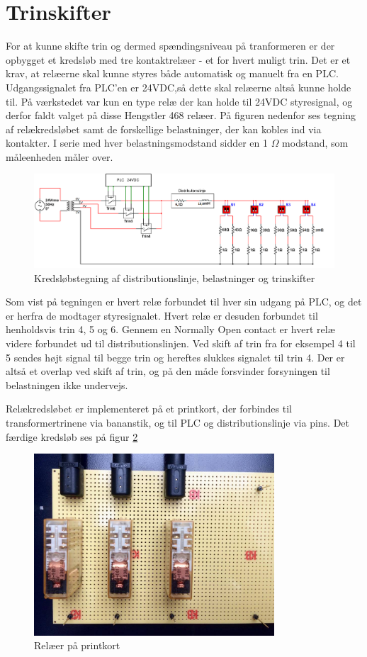 

\section{Trinskifter}
For at kunne skifte trin og dermed spændingsniveau på tranformeren er der opbygget et kredsløb med tre kontaktrelæer - et for hvert muligt trin. Det er et krav, at relæerne skal kunne styres både automatisk og manuelt fra en PLC. Udgangssignalet fra PLC'en er 24VDC,så dette skal relæerne altså kunne holde til. På værkstedet var kun en type relæ der kan holde til 24VDC styresignal, og derfor faldt valget på disse Hengstler 468 relæer. På figuren nedenfor ses tegning af relækredsløbet samt de forskellige belastninger, der kan kobles ind via kontakter. I serie med hver belastningsmodstand sidder en 1 $\Omega$ modstand, som måleenheden måler over. 


\begin{figure}[H] 
	\centering
	\includegraphics[width=1\textwidth]{Figure/Trinskiftertegning2}
	\caption{Kredsløbstegning af distributionslinje, belastninger og trinskifter}
	\label{fig:Trinskiftertegning2}
\end{figure}

Som vist på tegningen er hvert relæ forbundet til hver sin udgang på PLC, og det er herfra de modtager styresignalet. Hvert relæ er desuden forbundet til henholdsvis trin 4, 5 og 6. Gennem en Normally Open contact er hvert relæ videre forbundet ud til distributionslinjen. Ved skift af trin fra for eksempel 4 til 5 sendes højt signal til begge trin og hereftes slukkes signalet til trin 4. Der er altså et overlap ved skift af trin, og på den måde forsvinder forsyningen til belastningen ikke undervejs. 

Relækredsløbet er implementeret på et printkort, der forbindes til transformertrinene via bananstik, og til PLC og distributionslinje via pins. Det færdige kredsløb ses på figur \ref{fig:Relaekredsloeb}

\begin{figure}[H] 
	\centering
	\includegraphics[width=0.8\textwidth]{Figure/Relaekredsl}
	\caption{Relæer på printkort}
	\label{fig:Relaekredsloeb}
\end{figure}

